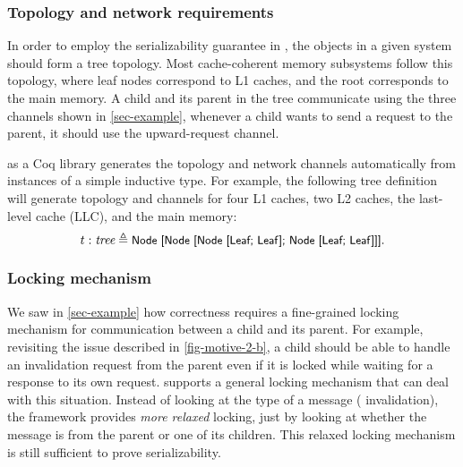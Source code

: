 \subsubsection{Topology and network requirements}

In order to employ the serializability guarantee in \hemiola{}, the objects in a given system should form a tree topology.
Most cache-coherent memory subsystems follow this topology, where leaf nodes correspond to L1 caches, and the root corresponds to the main memory.
A child and its parent in the tree communicate using the three channels shown in \autoref{sec-example}, \eg{} whenever a child wants to send a request to the parent, it should use the upward-request channel.

\hemiola{} as a Coq library generates the topology and network channels automatically from instances of a simple inductive type.
For example, the following tree definition will generate topology and channels for four L1 caches, two L2 caches, the last-level cache (LLC), and the main memory:
\begin{displaymath}
  t : \textit{tree} \triangleq \small{\textsf{Node [Node [Node [Leaf; Leaf]; Node [Leaf; Leaf]]]}}.
\end{displaymath}

\subsubsection{Locking mechanism}
\label{sec-locking-mechanism}

We saw in \autoref{sec-example} how correctness requires a fine-grained locking mechanism for communication between a child and its parent.
For example, revisiting the issue described in \autoref{fig-motive-2-b}, a child should be able to handle an invalidation request from the parent even if it is locked while waiting for a response to its own request.
\hemiola{} supports a general locking mechanism that can deal with this situation.
Instead of looking at the type of a message (\eg{} invalidation), the framework provides \emph{more relaxed} locking, just by looking at whether the message is from the parent or one of its children.
This relaxed locking mechanism is still sufficient to prove serializability.

